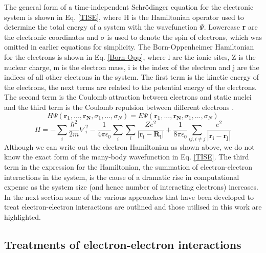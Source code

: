 \documentclass[11pt, twoside]{report}
\begin{document}
The general form of a time-independent Schr{\"o}dinger equation for the electronic system is shown in Eq. \ref{TISE}, where H is the Hamiltonian operator used to determine the total energy of a system with the wavefunction $\Psi$. Lowercase \textbf{r} are the electronic coordinates and $\sigma$ is used to denote the spin of electrons, which was omitted in earlier equations for simplicity. The Born-Oppenheimer Hamiltonian for the electrons is shown in Eq. \ref{Born-Opp}, where l are the ionic sites, Z is the nuclear charge, m is the electron mass, i is the index of the electron and j are the indices of all other electrons in the system. The first term is the kinetic energy of the electrons, the next terms are related to the potential energy of the electrons. The second term is the Coulomb attraction between electrons and static nuclei and the third term is the Coulomb repulsion between different electrons \cite{Prasad_ch2}.
\begin{equation}\label{TISE}
H\Psi(\mathbf{r_1}, ..., \mathbf{r_N}, \sigma_1, ..., \sigma_N) = E\Psi(\mathbf{r_1}, ..., \mathbf{r_N}, \sigma_1, ..., \sigma_N)
\end{equation}
\begin{equation}\label{Born-Opp}
H = - \sum_i \frac{\hbar^2}{2m}\nabla_i^2 - \frac{1}{4 \pi \epsilon_0}\sum_i \sum_l \frac{Ze^2}{|\mathbf{r_i}-\mathbf{R_l}|} + \frac{1}{8 \pi \epsilon_0} \sum_{ij, i \neq j}\frac{e^2}{|\mathbf{r_i}-\mathbf{r_j}|}
\end{equation}
Although we can write out the electron Hamiltonian as shown above, we do not know the exact form of the many-body wavefunction in Eq. \ref{TISE}. The third term in the expression for the Hamiltonian, the summation of electron-electron interactions in the system, is the cause of a dramatic rise in computational expense as the system size (and hence number of interacting electrons) increases. In the next section some of the various approaches that have been developed to treat electron-electron interactions are outlined and those utilised in this work are highlighted.


\subsection{Treatments of electron-electron interactions}
\end{document}
